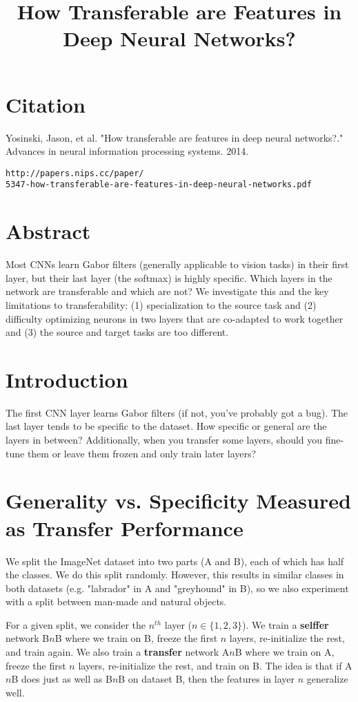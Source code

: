 \documentclass[a4paper]{article}
\title{How Transferable are Features in Deep Neural Networks?}
\date{}
\begin{document}
\maketitle

\section{Citation}
Yosinski, Jason, et al. "How transferable are features in deep neural networks?." Advances in neural information processing systems. 2014.

\begin{verbatim}
http://papers.nips.cc/paper/
5347-how-transferable-are-features-in-deep-neural-networks.pdf
\end{verbatim}

\section{Abstract}
Most CNNs learn Gabor filters (generally applicable to vision tasks) in their
first layer, but their last layer (the softmax) is highly specific. Which
layers in the network are transferable and which are not? We investigate
this and the key limitations to transferability: (1) specialization to
the source task and (2) difficulty optimizing neurons in two layers
that are co-adapted to work together and (3) the source and target tasks
are too different.

\section{Introduction}
The first CNN layer learns Gabor filters (if not, you've probably got a bug).
The last layer tends to be specific to the dataset. How specific or general
are the layers in between? Additionally, when you transfer some layers, should
you fine-tune them or leave them frozen and only train later layers?

\section{Generality vs. Specificity Measured as Transfer Performance}
We split the ImageNet dataset into two parts (A and B), each of which has
half the classes. We do this split randomly. However, this results in similar
classes in both datasets (e.g. "labrador" in A and "greyhound" in B), so
we also experiment with a split between man-made and natural objects.

For a given split, we consider the $n^{th}$ layer ($n \in \{1, 2, 3\}$). We
train a \textbf{selffer} network B$n$B where we train on B, freeze the first $n$
layers, re-initialize the rest, and train again. We also train a
\textbf{transfer} network A$n$B where we train on A, freeze the first $n$
layers, re-initialize the rest, and train on B. The idea is that if
A$n$B does just as well as B$n$B on dataset B, then the features in layer $n$
generalize well.
\end{document}
